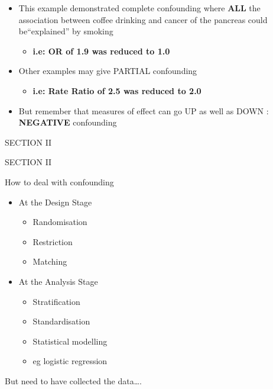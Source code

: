 \documentclass[ignorenonframetext,]{beamer}
\begin{document}
\begin{frame}

\begin{itemize}
\itemsep1pt\parskip0pt
\item
  This example demonstrated complete confounding where \textbf{ALL} the
  association between coffee drinking and cancer of the pancreas could
  be``explained'' by smoking

  \begin{itemize}
  \itemsep1pt\parskip0pt
  \item
    \textbf{i.e: OR of 1.9 was reduced to 1.0}
  \end{itemize}
\item
  Other examples may give PARTIAL confounding

  \begin{itemize}
  \itemsep1pt\parskip0pt
  \item
    \textbf{i.e: Rate Ratio of 2.5 was reduced to 2.0}
  \end{itemize}
\item
  But remember that measures of effect can go UP as well as DOWN :
  \textbf{NEGATIVE} confounding
\end{itemize}

\end{frame}

\begin{frame}{SECTION II}

SECTION II

\end{frame}

\begin{frame}{How to deal with confounding}

\begin{itemize}
\itemsep1pt\parskip0pt
\item
  At the Design Stage

  \begin{itemize}
  \itemsep1pt\parskip0pt
  \item
    Randomisation
  \item
    Restriction
  \item
    Matching
  \end{itemize}
\item
  At the Analysis Stage

  \begin{itemize}
  \itemsep1pt\parskip0pt
  \item
    Stratification
  \item
    Standardisation
  \item
    Statistical modelling
  \item
    eg logistic regression
  \end{itemize}
\end{itemize}

But need to have collected the data\ldots{}.

\end{frame}
\end{document}
